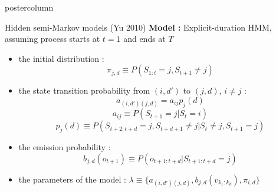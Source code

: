 \documentclass[final,hyperref={pdfpagelabels=false}]{beamer}
\begin{document}
\begin{frame}
\begin{columns}
\begin{column}{.50\textwidth}
\begin{beamercolorbox}[center,wd=\textwidth]{postercolumn}
\begin{minipage}[T]{.98\textwidth}
{\begin{block}{Hidden semi-Markov models (Yu 2010)}
                \vskip0.5cm
                \textbf{Model :} Explicit-duration HMM, assuming process starts at $t=1$ and ends at $T$
                \begin{itemize}
                    \item[\bullet] the initial distribution :
                    $$\pi_{j,d} \equiv P(S_{1:t} = j, S_{t+1} \neq j)$$
                    \item[\bullet] the state transition probability from $(i,d')$ to $(j,d)$, $i \neq j$ :
                    $$a_{(i,d')(j,d)}=a_{ij}p_j(d)$$
                    $$a_{ij} \equiv P(S_{t+1} = j | S_t = i)$$
                    $$p_j(d) \equiv P(S_{t+2:t+d} = j, S_{t+d+1} \neq j | S_t \neq j, S_{t+1} = j)$$
                    \item[\bullet] the emission probability :
                    $$b_{j,d}(o_{t+1}) \equiv P(o_{t+1:t+d} | S_{t+1:t+d} = j)$$
                    \item[\bullet] the parameters of the model : $\lambda \equiv \{a_{(i,d')(j,d)},b_{j,d}(v_{k_1:k_d}), \pi_{i,d}\}$
                \end{itemize}

            \end{block}
          }
        \end{minipage}
      \end{beamercolorbox}
    \end{column}


\end{columns}
\end{frame}
\end{document}
